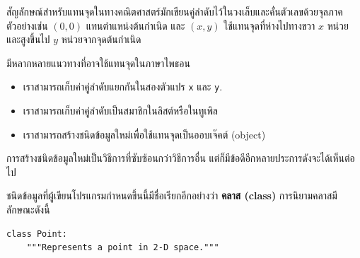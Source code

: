สัญลักษณ์สำหรับแทนจุดในทางคณิตศาสตร์มักเขียนคู่ลำดับไว้ในวงเล็บและคั่นตัวเลขด้วยจุลภาค ตัวอย่างเช่น
$(0,0)$ แทนตำแหน่งต้นกำเนิด และ  $(x,y)$ ใช้แทนจุดที่ห่างไปทางขวา $x$ หน่วย และสูงขึ้นไป  $y$ หน่วยจากจุดต้นกำเนิด

มีหลากหลายแนวทางที่อาจใช้แทนจุดในภาษาไพธอน

\begin{itemize}


\item เราสามารถเก็บค่าคู่ลำดับแยกกันในสองตัวแปร {\tt x} และ {\tt y}.


\item เราสามารถเก็บค่าคู่ลำดับเป็นสมาชิกในลิสต์หรือในทูเพิล


\item เราสามารถสร้างชนิดข้อมูลใหม่เพื่อใช้แทนจุดเป็นออบเจ๊คต์ (object)

\end{itemize}



การสร้างชนิดข้อมูลใหม่เป็นวิธีการที่ซับซ้อนกว่าวิธีการอื่น  แต่ก็มีข้อดีอีกหลายประการดังจะได้เห็นต่อไป


ชนิดข้อมูลที่ผู้เขียนโปรแกรมกำหนดขึ้นนี้มีชื่อเรียกอีกอย่างว่า {\bf คลาส (class)}
การนิยามคลาสมีลักษณะดังนี้


\begin{verbatim}
class Point:
    """Represents a point in 2-D space."""
\end{verbatim}
%

